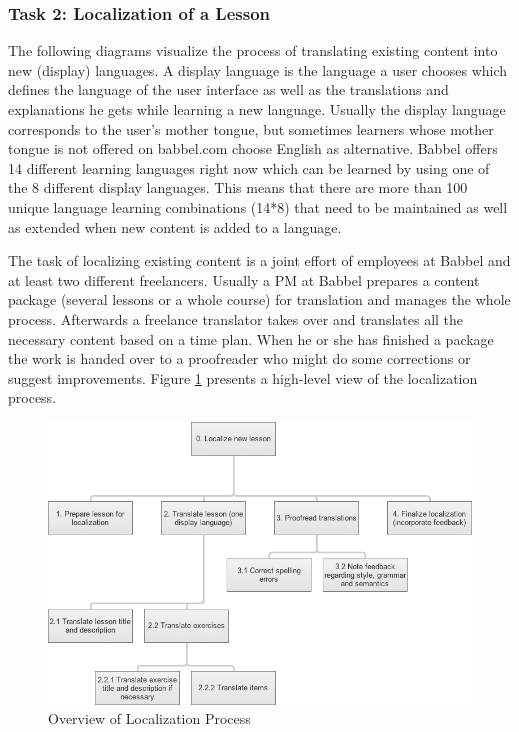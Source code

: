 \subsubsection{Task 2: Localization of a Lesson} \label{sec:task-localization}
The following diagrams visualize the process of translating existing content into new (display) languages. A display language is the language a user chooses which defines the language of the user interface as well as the translations and explanations he gets while learning a new language. Usually the display language corresponds to the user’s mother tongue, but sometimes learners whose mother tongue is not offered on babbel.com choose English as alternative. Babbel offers 14 different learning languages right now which can be learned by using one of the 8 different display languages. This means that there are more than 100 unique language learning combinations (14*8) that need to be maintained as well as extended when new content is added to a language.

The task of localizing existing content is a joint effort of employees at Babbel and at least two different freelancers. Usually a \ac{PM} at Babbel prepares a content package (several lessons or a whole course) for translation and manages the whole process. Afterwards a freelance translator takes over and translates all the necessary content based on a time plan. When he or she has finished a package the work is handed over to a proofreader who might do some corrections or suggest improvements. Figure \ref{fig:loc-overview} presents a high-level view of the localization process.

\begin{figure}[h]
 \centering
 \includegraphics[width=12cm]{images/task-analysis/localize_lesson}
 \caption{Overview of Localization Process}
 \label{fig:loc-overview}
\end{figure}

